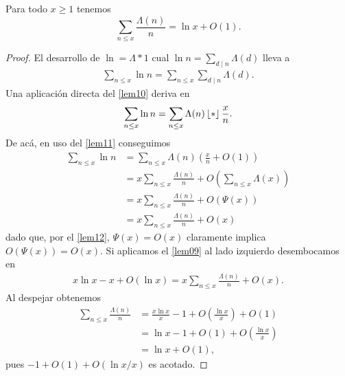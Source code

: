 \begin{lemma}\label{lem14}
Para todo $x \geq 1$ tenemos
\[
\sum_{n \leq x} \frac{\Lambda(n)}{n} = \ln x + O(1).
\]
\end{lemma}

\begin{proof}
El desarrollo de  $\ln = \Lambda * 1$ cual 
$\ln n = \sum_{d \mid n} \Lambda(d)$ 
lleva a
\begin{align}
\sum_{n \leq x} \ln n = \sum_{n \leq x} \sum_{d \mid n} \Lambda(d).
\end{align}
Una aplicaci\'on directa del \cref{lem10} deriva en 
\begin{align}
\sum_{n \leq x} \ln n = \sum_{n \leq x} \Lambda(n) \left\lfloor * \right\rfloor{\frac{x}{n}}. 
\end{align}
De ac\'a, en uso del \cref{lem11} conseguimos
\begin{align}
\sum_{n \leq x} \ln n &= \sum_{n \leq x} \Lambda(n) \left(\frac{x}{n} + O(1)\right) \\
&= x \sum_{n \leq x} \frac{\Lambda(n)}{n} + O\left(\sum_{n \leq x} \Lambda(x) \right) \\
&= x \sum_{n \leq x} \frac{\Lambda(n)}{n} + O(\Psi(x)) \\
&= x \sum_{n \leq x} \frac{\Lambda(n)}{n} + O(x)
\end{align}
dado que, por el \cref{lem12}, $\Psi(x) = O(x)$ claramente implica $O(\Psi(x))=O(x)$. 
Si aplicamos el \cref{lem09} al lado izquierdo desembocamos en
\begin{align}
x\ln x - x + O(\ln x) = x \sum_{n \leq x} \frac{\Lambda(n)}{n} + O(x). 
\end{align}
Al despejar obtenemos 
\begin{align}
\sum_{n \leq x} \frac{\Lambda(n)}{n} &= \frac{x \ln x}{x} - 1 + O\left(\frac{\ln x}{x}\right) + O(1) \\
&= \ln x - 1 + O(1) + O\left(\frac{\ln x}{x}\right) \\
&= \ln x + O(1),
\end{align}
pues $-1 + O(1)+ O(\ln x/x)$ es acotado. 
\end{proof}


